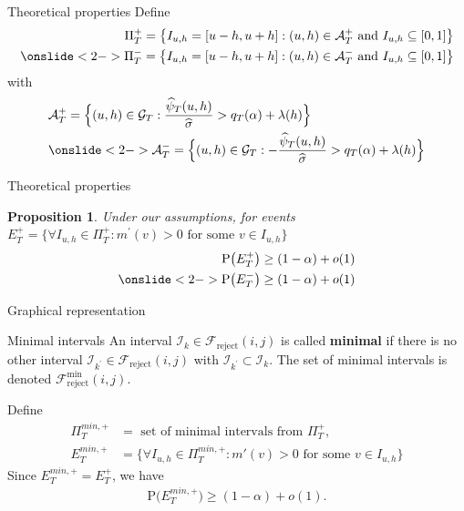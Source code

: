 \documentclass[10pt]{beamer}
\newcommand{\Prob}{\mathrm{P}}
\newtheorem{prop}{Proposition}
\begin{document}
\begin{frame}{Theoretical properties}
Define
\begin{align*}
\Pi_T^+ = \big\{ I_{u,h} = [u-h,u+h]: (u,h) \in \mathcal{A}_T^+ \text{ and } I_{u, h} \subseteq [0,1] \big\}\\
\onslide<2->{\Pi_T^- = \big\{ I_{u,h} = [u-h,u+h]: (u,h) \in \mathcal{A}_T^- \text{ and } I_{u, h} \subseteq [0,1] \big\}}
\end{align*}
\vspace{-5mm}
with
\begin{align*} 
&\mathcal{A}_T^+ = \Big\{ (u,h) \in \mathcal{G}_T: \frac{\widehat{\psi}_T(u,h)}{\widehat{\sigma}} > q_T(\alpha)  + \lambda(h)  \Big\}\\
&\onslide<2->{\mathcal{A}_T^- = \Big\{ (u,h) \in \mathcal{G}_T: -\frac{\widehat{\psi}_T(u,h)}{\widehat{\sigma}} > q_T(\alpha)  + \lambda(h)  \Big\}}
\end{align*}
\end{frame}

\begin{frame}{Theoretical properties}
\begin{prop}\label{prop-shape-3}
Under our assumptions, for events $E_T^+ = \Big\{ \forall I_{u,h} \in \Pi_T^+: m^{\prime}(v) > 0 \text{ for some } v \in I_{u,h}\Big\}$
\begin{align*}
\Prob \big( E_T^+ \big) \ge (1-\alpha) + o(1)\\
\onslide<2->{\Prob \big( E_T^- \big) \ge (1-\alpha) + o(1)}
\end{align*} 
\end{prop}
\end{frame}

\begin{frame}{Graphical representation}
\begin{block}{Minimal intervals}
An interval $\mathcal{I}_k \in \mathcal{F}_{\text{reject}}(i, j)$ is called \textbf{minimal} if there is no other interval $\mathcal{I}_{k^\prime} \in \mathcal{F}_{\text{reject}}(i, j)$ with $\mathcal{I}_{k^\prime} \subset \mathcal{I}_k$. The set of minimal intervals is denoted $\mathcal{F}_{\text{reject}}^\min (i, j)$.
\end{block}\pause
Define
\begin{align*}
\Pi^{min, +}_T &= \text{ set of minimal intervals from }\Pi^+_T,\\
E_T^{min, +} &= \Big\{ \forall I_{u,h} \in \Pi_T^{min, +}: m'(v) > 0 \text{ for some } v \in I_{u,h}\Big\}
\end{align*}\pause
Since $E_T^{min, +} = E_T^{+}$, we have
\begin{align*}
\Prob \big( E_T^{min, +} \big) \ge (1-\alpha) + o(1).
\end{align*}
\end{frame}
\end{document}
